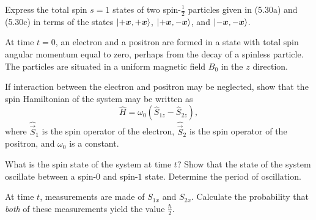 \documentclass{../phys116}
\newcommand{\kv}[2]{\ket{#1 \vec{#2}}}
\newcommand{\kvv}[3]{\ket{#2 \vec{#1}, #3 \vec{#1}}}
\newcommand{\xx}{\kvv x}
\begin{document}
\begin{exercise}
  Express the total spin \(s=1\) states of two spin-\(\frac 1 2\) particles given in (5.30a) and (5.30c) in terms of the states \(\xx ++\), \(\xx +-\), and \(\xx --\).
\end{exercise}

\begin{solution}
\end{solution}


\begin{solution}
\end{solution}

\begin{exercise}
  At time \(t=0\), an electron and a positron are formed in a state with total spin angular momentum equal to zero, perhaps from the decay of a spinless particle.  The particles are situated in a uniform magnetic field \(B_0\) in the \(z\) direction.
  \begin{problems}
  \item If interaction between the electron and positron may be neglected, show that the spin Hamiltonian of the system may be written as 
    \[
      \hat H = \omega_0 (\hat S_{1z} - \hat S_{2z}),
    \]
    where \(\hat{\vec S}_1\) is the spin operator of the electron, \(\hat{\vec S}_2\) is the spin operator of the positron, and \(\omega_0\) is a constant.
  \item What is the spin state of the system at time \(t\)?  Show that the state of the system oscillate between a spin-\(0\) and spin-\(1\) state.  Determine the period of oscillation.
  \item At time \(t\), measurements are made of \(S_{1x}\) and \(S_{2x}\).  Calculate the probability that \emph{both} of these measurements yield the value \(\frac \hbar 2\).
  \end{problems}
\end{exercise}
\end{document}
